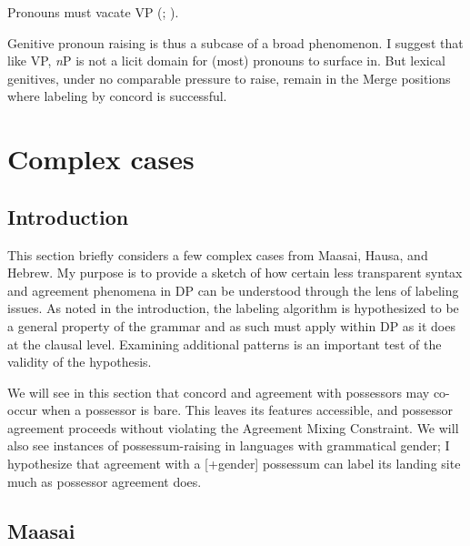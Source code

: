 \documentclass[output=paper
,modfonts
,nonflat]{langsci/langscibook}
\begin{document}
\begin{exe}
\ex\label{ex-carstens:42} \xlist
{}
\endxlist
\end{exe}
\begin{exe} 
\ex Pronouns must vacate VP (\citealt{Diesing1992, Diesing1997}; \citealt{Diesing_Jelinek1995}).
\end{exe}
Genitive pronoun raising is thus a subcase of a broad phenomenon. I suggest that like VP, \textit{n}P is not a licit domain for (most) pronouns to surface in. But lexical genitives, under no comparable pressure to raise, remain in the Merge positions where labeling by concord is successful. 

\section{Complex cases} \label{sec-carstens:6}
\subsection{Introduction} \label{sec-carstens:6.1}

This section briefly considers a few complex cases from Maasai, Hausa, and Hebrew. My purpose is to provide a sketch of how certain less transparent syntax and agreement phenomena in DP can be understood through the lens of labeling issues. As noted in the introduction, the labeling algorithm is hypothesized to be a general property of the grammar and as such must apply within DP as it does at the clausal level. Examining additional patterns is an important test of the validity of the hypothesis.

We will see in this section that concord and agreement with possessors may co-occur when a possessor is bare. This leaves its features accessible, and possessor agreement proceeds without violating the Agreement Mixing Constraint. We will also see instances of possessum-raising in languages with grammatical gender; I hypothesize that agreement with a [+gender] possessum can label its landing site much as possessor agreement does.

\subsection{Maasai} \label{sec-carstens:6.2}
\end{document}
